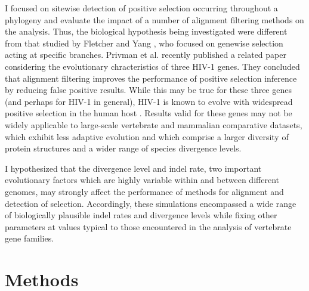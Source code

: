 I focused on sitewise detection of positive selection occurring
throughout a phylogeny and evaluate the impact of a number of
alignment filtering methods on the \sw analysis. Thus, the biological
hypothesis being investigated were different from that studied by
Fletcher and Yang \citeyearpar{Fletcher2010}, who focused on
genewise selection acting at specific branches.  Privman et
al. \citeyearpar{Privman2011Improving} recently published a related
paper considering the evolutionary chracteristics of three HIV-1
genes. They concluded that alignment filtering improves the
performance of positive selection inference by reducing false positive
results. While this may be true for these three genes (and perhaps for
HIV-1 in general), HIV-1 is known to evolve with widespread positive
selection in the human host \citep{Yang2003Widespread}. Results valid
for these genes may not be widely applicable to large-scale vertebrate
and mammalian comparative datasets, which exhibit less adaptive
evolution \citep{Kosiol2008Patterns} and which comprise a larger
diversity of protein structures and a wider range of species
divergence levels.

I hypothesized that the divergence level and indel rate, two important
evolutionary factors which are highly variable within and between
different genomes, may strongly affect the performance of methods for
alignment and detection of selection. Accordingly, these simulations
encompassed a wide range of biologically plausible indel rates and
divergence levels while fixing other parameters at values typical to
those encountered in the \sw analysis of vertebrate gene families.

\section{Methods}

